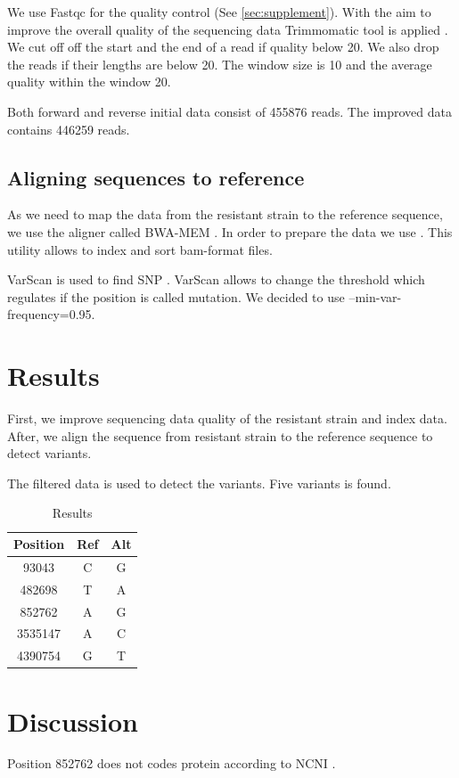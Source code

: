\documentclass{article}
\begin{document}
We use Fastqc for the quality control \cite{fqc} (See \ref{sec:supplement}).  With the aim to improve the overall quality of the sequencing data Trimmomatic tool is applied \cite{trim}. We cut off  off the start and the end of a read if quality below 20. We also drop the reads if their lengths are below 20. The window size is 10 and  the average quality  within the window 20. 

 Both forward and reverse initial data consist of 455876 reads. The improved data contains 446259 reads.  \\

\subsection{Aligning sequences to reference}
As we need to map the data from the resistant strain to the reference sequence, we use the aligner called BWA-MEM \cite{bwa}. In order to prepare the data we use \cite{sam}. This utility allows to index and sort bam-format files.

VarScan is used to find SNP \cite{var}. VarScan allows to change the threshold which regulates if  the position is called mutation. We decided to use --min-var-frequency=0.95. 

\section{Results}
First, we improve sequencing data quality of the resistant strain and index data. After, we align the sequence from resistant strain to the reference sequence to detect variants. 
 

The filtered data is used to detect the variants. Five variants is found. 

\begin{table}[h!]
\centering
\begin{tabular}{||c c c  ||} 
 \hline
Position  & Ref & Alt    \\ [0.5ex] 
 \hline\hline
93043 & C & G  \\ 
482698 & T & A    \\
852762 & A & G   \\
3535147 & A & C   \\ 
4390754 & G & T  \\ [1ex] 
 \hline
\end{tabular}
\caption{Results }
\label{table:2}
\end{table}


\section{Discussion}
Position 852762 does not codes protein according to NCNI \cite{ncbi}.
\end{document}
